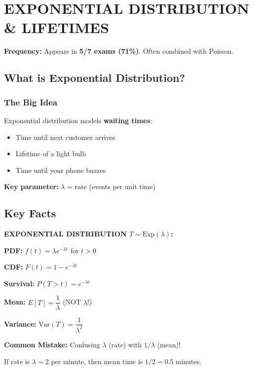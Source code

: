 \documentclass[10pt,letterpaper]{article}
\begin{document}
\newpage

\section{EXPONENTIAL DISTRIBUTION \& LIFETIMES}

\begin{criticalbox}
\textbf{Frequency:} Appears in \textbf{5/7 exams (71\%)}. Often combined with Poisson.
\end{criticalbox}

\subsection{What is Exponential Distribution?}

\subsubsection{The Big Idea}

Exponential distribution models \textbf{waiting times}:
\begin{itemize}
  \item Time until next customer arrives
  \item Lifetime of a light bulb
  \item Time until your phone buzzes
\end{itemize}

\textbf{Key parameter:} $\lambda$ = rate (events per unit time)

\subsection{Key Facts}

\begin{formulabox}
\textbf{EXPONENTIAL DISTRIBUTION $T \sim \text{Exp}(\lambda)$:}

\vspace{0.2cm}

\textbf{PDF:} $f(t) = \lambda e^{-\lambda t}$ for $t > 0$

\textbf{CDF:} $F(t) = 1 - e^{-\lambda t}$

\textbf{Survival:} $P(T > t) = e^{-\lambda t}$

\textbf{Mean:} $E[T] = \dfrac{1}{\lambda}$ \quad (NOT $\lambda$!)

\textbf{Variance:} $\text{Var}(T) = \dfrac{1}{\lambda^2}$
\end{formulabox}

\begin{warningbox}
\textbf{Common Mistake:} Confusing $\lambda$ (rate) with $1/\lambda$ (mean)!

If rate is $\lambda = 2$ per minute, then mean time is $1/2 = 0.5$ minutes.
\end{warningbox}
\end{document}
